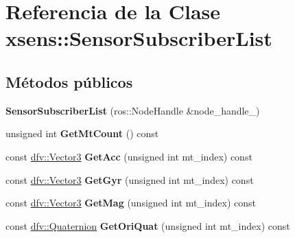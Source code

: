 \hypertarget{classxsens_1_1SensorSubscriberList}{\section{\-Referencia de la \-Clase xsens\-:\-:\-Sensor\-Subscriber\-List}
\label{classxsens_1_1SensorSubscriberList}
}
\subsection*{\-Métodos públicos}
\begin{DoxyCompactItemize}
\item 
\hypertarget{classxsens_1_1SensorSubscriberList_ab9cc55e55b95e255a236fec728678e8c}{{\bfseries \-Sensor\-Subscriber\-List} (ros\-::\-Node\-Handle \&node\-\_\-handle\-\_\-)}\label{classxsens_1_1SensorSubscriberList_ab9cc55e55b95e255a236fec728678e8c}

\item 
\hypertarget{classxsens_1_1SensorSubscriberList_afed12cf4b9478ff1f34677b3f5a6ec18}{unsigned int {\bfseries \-Get\-Mt\-Count} () const }\label{classxsens_1_1SensorSubscriberList_afed12cf4b9478ff1f34677b3f5a6ec18}

\item 
\hypertarget{classxsens_1_1SensorSubscriberList_adee3cd2bf2995d080fa8b9fda8c4de8d}{const \hyperlink{classdfv_1_1Vector3}{dfv\-::\-Vector3} {\bfseries \-Get\-Acc} (unsigned int mt\-\_\-index) const }\label{classxsens_1_1SensorSubscriberList_adee3cd2bf2995d080fa8b9fda8c4de8d}

\item 
\hypertarget{classxsens_1_1SensorSubscriberList_a118cd3df0eae2df308aab444a6e21ba2}{const \hyperlink{classdfv_1_1Vector3}{dfv\-::\-Vector3} {\bfseries \-Get\-Gyr} (unsigned int mt\-\_\-index) const }\label{classxsens_1_1SensorSubscriberList_a118cd3df0eae2df308aab444a6e21ba2}

\item 
\hypertarget{classxsens_1_1SensorSubscriberList_a92b22c0a8b83b6ba578970b8dfa26d0c}{const \hyperlink{classdfv_1_1Vector3}{dfv\-::\-Vector3} {\bfseries \-Get\-Mag} (unsigned int mt\-\_\-index) const }\label{classxsens_1_1SensorSubscriberList_a92b22c0a8b83b6ba578970b8dfa26d0c}

\item 
\hypertarget{classxsens_1_1SensorSubscriberList_ab782afbc0464fda1fd9d4be70f0d8f17}{const \hyperlink{classdfv_1_1Quaternion}{dfv\-::\-Quaternion} {\bfseries \-Get\-Ori\-Quat} (unsigned int mt\-\_\-index) const }\label{classxsens_1_1SensorSubscriberList_ab782afbc0464fda1fd9d4be70f0d8f17}


\end{DoxyCompactItemize}
